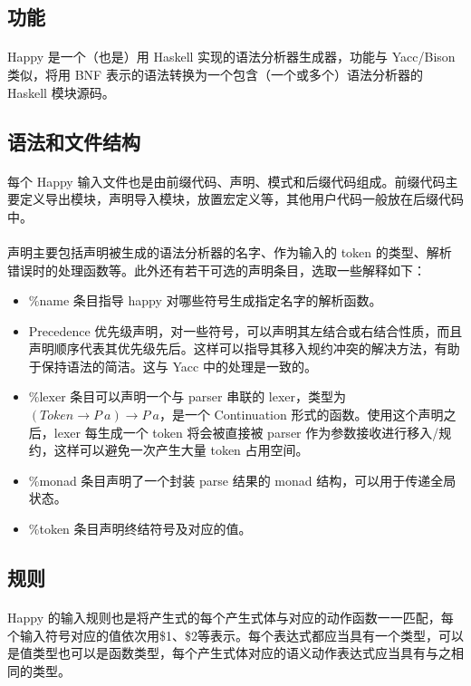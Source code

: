\documentclass{article}
\begin{document}
	\subsection{功能}
	\paragraph{}
	Happy\cite{happy} 是一个（也是）用 Haskell 实现的语法分析器生成器，功能与 Yacc/Bison 类似，将用 BNF 表示的语法转换为一个包含（一个或多个）语法分析器的 Haskell 模块源码。
	\subsection{语法和文件结构}
	\paragraph{}
	每个 Happy 输入文件也是由前缀代码、声明、模式和后缀代码组成。前缀代码主要定义导出模块，声明导入模块，放置宏定义等，其他用户代码一般放在后缀代码中。
	\paragraph{}
	声明主要包括声明被生成的语法分析器的名字、作为输入的 token 的类型、解析错误时的处理函数等。此外还有若干可选的声明条目，选取一些解释如下：
	\begin{itemize}
		\item \%name 条目指导 happy 对哪些符号生成指定名字的解析函数。
		\item Precedence 优先级声明，对一些符号，可以声明其左结合或右结合性质，而且声明顺序代表其优先级先后。这样可以指导其移入规约冲突的解决方法，有助于保持语法的简洁。这与 Yacc 中的处理是一致的。
		\item \%lexer 条目可以声明一个与 parser 串联的 lexer，类型为 $(Token \to P\ a) \to P\ a$，是一个 Continuation 形式的函数。使用这个声明之后，lexer 每生成一个 token 将会被直接被 parser 作为参数接收进行移入/规约，这样可以避免一次产生大量 token 占用空间。
		\item \%monad 条目声明了一个封装 parse 结果的 monad 结构，可以用于传递全局状态。
		\item \%token 条目声明终结符号及对应的值。
	\end{itemize}
 	\subsection{规则}
 	\paragraph{}
 	Happy 的输入规则也是将产生式的每个产生式体与对应的动作函数一一匹配，每个输入符号对应的值依次用\$1、\$2等表示。每个表达式都应当具有一个类型，可以是值类型也可以是函数类型，每个产生式体对应的语义动作表达式应当具有与之相同的类型。
\end{document}
